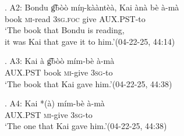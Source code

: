 \documentclass{assets/fieldnotes}
\begin{document}
\cg. A2: Bondu g͡bòò míŋ-kààntèà, Kai ànà bè à-mà\\
{} {} book \textsc{mi}-read {} \textsc{3sg.foc} give \textsc{AUX.PST}-to\\
`The book that Bondu is reading,\\it was Kai that gave it to him.’\hfill{(04-22-25, 44:14)}

\dg. A3: Kai à g͡bòò mím-bè à-mà\\
{} {} \textsc{AUX.PST} book \textsc{mi}-give \textsc{3sg}-to\\
`The book that Kai gave him.’\hfill{(04-22-25, 44:38)}

\eg. A4: Kai *(à) mím-bè à-mà\\
{} {} \textsc{AUX.PST} \textsc{mi}-give \textsc{3sg}-to\\
`The one that Kai gave him.’\hfill{(04-22-25, 44:38)}
\end{document}
